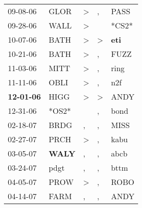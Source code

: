 \begin{supertabular}{p{0.07\textwidth}p{0.06\textwidth}p{0.02\textwidth}p{0.02\textwidth}p{0.06\textwidth}}
          09-08-06\textsuperscript{} &           GLOR\textsuperscript{} &     \textgreater &                , &           PASS\textsuperscript{} \\
          09-28-06\textsuperscript{} &           WALL\textsuperscript{} &     \textgreater &                  &                            *CS2* \\
          10-07-06\textsuperscript{} &           BATH\textsuperscript{} &     \textgreater &     \textgreater &   \textbf{eti\textsuperscript{}} \\
          10-21-06\textsuperscript{} &           BATH\textsuperscript{} &     \textgreater &                , &           FUZZ\textsuperscript{} \\
          11-03-06\textsuperscript{} &           MITT\textsuperscript{} &     \textgreater &                , &           ring\textsuperscript{} \\
          11-11-06\textsuperscript{} &           OBLI\textsuperscript{} &     \textgreater &                , &            n2f\textsuperscript{} \\
 \textbf{12-01-06\textsuperscript{}} &           HIGG\textsuperscript{} &     \textgreater &     \textgreater &           ANDY\textsuperscript{} \\
          12-31-06\textsuperscript{} &                            *OS2* &                  &                , &           bond\textsuperscript{} \\
          02-18-07\textsuperscript{} &           BRDG\textsuperscript{} &                , &                , &           MISS\textsuperscript{} \\
          02-27-07\textsuperscript{} &           PRCH\textsuperscript{} &     \textgreater &                , &           kabu\textsuperscript{} \\
          03-05-07\textsuperscript{} &  \textbf{WALY\textsuperscript{}} &                , &                , &           abcb\textsuperscript{} \\
          03-24-07\textsuperscript{} &           pdgt\textsuperscript{} &                , &                , &           bttm\textsuperscript{} \\
          04-05-07\textsuperscript{} &           PROW\textsuperscript{} &     \textgreater &                , &           ROBO\textsuperscript{} \\
          04-14-07\textsuperscript{} &           FARM\textsuperscript{} &                , &                , &           ANDY\textsuperscript{} \\

\end{supertabular}
